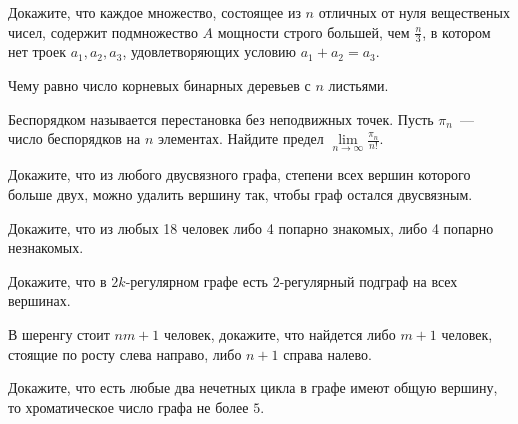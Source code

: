 \setcounter{curtask}{1}

\mytitle{}

\begin{task}
    Докажите, что каждое множество, состоящее из $n$ отличных от нуля вещественых
    чисел, содержит подмножество $A$ мощности строго большей, чем $\frac{n}{3}$, в
    котором нет троек $a_1, a_2, a_3$, удовлетворяющих условию $a_1 + a_2 = a_3$.
\end{task}

\begin{task}
    Чему равно число корневых бинарных деревьев с $n$ листьями.
\end{task}

\begin{task}
    Беспорядком называется перестановка без неподвижных точек. Пусть $\pi_n$~---
    число беспорядков на $n$ элементах. Найдите предел $\lim\limits_{n \to \infty}
    \frac{\pi_n}{n!}$.
\end{task}

\begin{task}
    Докажите, что из любого двусвязного графа, степени всех вершин которого больше
    двух, можно удалить вершину так, чтобы граф остался двусвязным.
\end{task}

\begin{task}
    Докажите, что из любых 18 человек либо 4 попарно знакомых, либо 4 попарно незнакомых.
\end{task}

\begin{task}
    Докажите, что в $2k$-регулярном графе есть $2$-регулярный подграф на всех вершинах.
\end{task}

\begin{task}
    В шеренгу стоит $nm + 1$ человек, докажите, что найдется либо $m + 1$ человек,
    стоящие по росту слева направо, либо $n + 1$ справа налево.
\end{task}

\begin{task}
    Докажите, что есть любые два нечетных цикла в графе имеют общую вершину, то
    хроматическое число графа не более $5$.
\end{task}